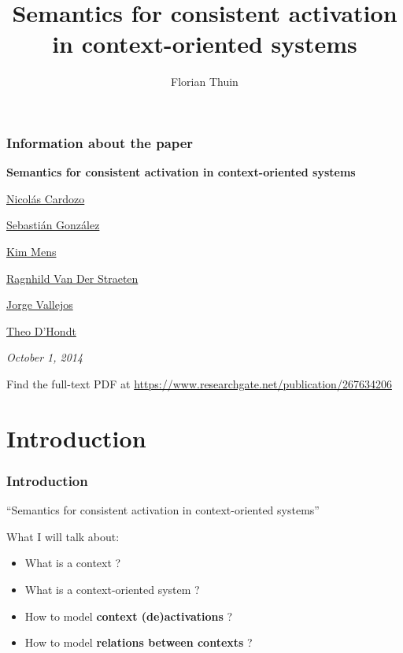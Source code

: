 \documentclass{beamer}
\title{Semantics for consistent activation in context-oriented systems}
\author{Florian Thuin}
\institute{Ecole Polytechnique de Louvain}
\begin{document}
\begin{frame}[plain]
	\titlepage
\end{frame}

\begin{frame}
	\frametitle{Information about the paper}

	\begin{center}
	\textbf{Semantics for consistent activation in context-oriented systems}
	\bigskip


	\href{https://www.researchgate.net/profile/Nicolas_Cardozo}{Nicolás Cardozo}

	\href{https://www.researchgate.net/profile/Sebastian_Gonzalez4}{Sebastián González}

	\href{https://www.researchgate.net/profile/Kim_Mens}{Kim Mens}

	\href{https://www.researchgate.net/profile/Ragnhild_Van_Der_Straeten}{Ragnhild Van Der Straeten}

	\href{https://www.researchgate.net/profile/Jorge_Vallejos}{Jorge Vallejos}

	\href{https://www.researchgate.net/researcher/76177048_Theo_DHondt}{Theo D'Hondt}
	\bigskip

	\textit{October 1, 2014}
	\end{center}

	\bigskip

	Find the full-text PDF at \url{https://www.researchgate.net/publication/267634206}
\end{frame}


\section{Introduction}

\begin{frame}
	\frametitle{Introduction}

	\begin{center}
	\enquote{\Large Semantics for consistent activation in context-oriented systems} \newline
	\end{center}

	What I will talk about:

	\begin{itemize}
		\item What is a context ?
		\item What is a context-oriented system ?
		\item How to model \textbf{context (de)activations} ?
		\item How to model \textbf{relations between contexts} ?
	\end{itemize}
\end{frame}
\end{document}
